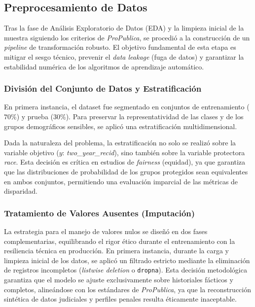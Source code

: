 \documentclass[11pt,a4paper]{article}
\begin{document}
\subsection{Preprocesamiento de Datos}
\label{subsec:preprocesamiento}

Tras la fase de Análisis Exploratorio de Datos (EDA) y la limpieza inicial de la muestra siguiendo los criterios de \textit{ProPublica}, se procedió a la construcción de un \textit{pipeline} de transformación robusto. El objetivo fundamental de esta etapa es mitigar el sesgo técnico, prevenir el \textit{data leakage} (fuga de datos) y garantizar la estabilidad numérica de los algoritmos de aprendizaje automático.

\subsubsection{División del Conjunto de Datos y Estratificación}

En primera instancia, el dataset fue segmentado en conjuntos de entrenamiento ($70\%$) y prueba ($30\%$). Para preservar la representatividad de las clases y de los grupos demográficos sensibles, se aplicó una estratificación multidimensional. 

Dada la naturaleza del problema, la estratificación no solo se realizó sobre la variable objetivo ($y$: \textit{two\_year\_recid}), sino también sobre la variable protectora \textit{race}. Esta decisión es crítica en estudios de \textit{fairness} (equidad), ya que garantiza que las distribuciones de probabilidad de los grupos protegidos sean equivalentes en ambos conjuntos, permitiendo una evaluación imparcial de las métricas de disparidad.

\subsubsection{Tratamiento de Valores Ausentes (Imputación)}

La estrategia para el manejo de valores nulos se diseñó en dos fases complementarias, equilibrando el rigor ético durante el entrenamiento con la resiliencia técnica en producción. En primera instancia, durante la carga y limpieza inicial de los datos, se aplicó un filtrado estricto mediante la eliminación de registros incompletos (\textit{listwise deletion} o \texttt{dropna}). Esta decisión metodológica garantiza que el modelo se ajuste exclusivamente sobre historiales fácticos y completos, alineándose con los estándares de \textit{ProPublica}, ya que la reconstrucción sintética de datos judiciales y perfiles penales resulta éticamente inaceptable.
\end{document}
